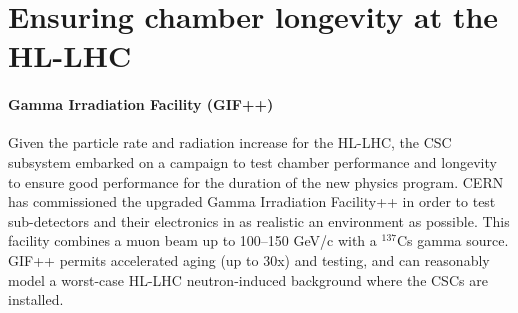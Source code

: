 \documentclass[a4paper,11pt]{article}
\begin{document}
\section{Ensuring chamber longevity at the HL-LHC}
\label{sec:longevity}
\paragraph{Gamma Irradiation Facility (GIF++)}Given the particle rate and radiation increase for the HL-LHC, the CSC subsystem embarked on a campaign to test chamber performance and longevity to ensure good performance for the duration of the new physics program. CERN has commissioned the upgraded Gamma Irradiation Facility++ in order to test sub-detectors and their electronics in as realistic an environment as possible. This facility combines a muon beam up to 100--150 GeV/c with a $^{137}$Cs gamma source. GIF++ permits accelerated aging (up to 30x) and testing,
and can reasonably model a worst-case HL-LHC neutron-induced background where the CSCs are installed.
\end{document}
